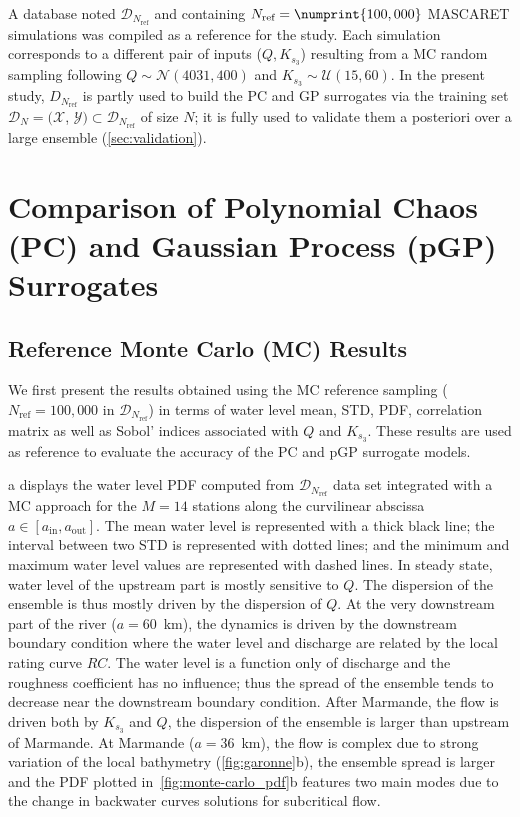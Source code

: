 A database noted $\mathcal{D}_{N_{\text{ref}}}$ and containing $N_{\text{ref}} = \numprint{100,000}$ MASCARET simulations was compiled as a reference for the study. Each simulation corresponds to a different pair of inputs ($Q, K_{s_3}$) resulting from a MC random sampling following $Q\sim\mathcal{N}(4031,400)$ and $K_{s_3} \sim \mathcal{U}(15,60)$. In the present study, $D_{N_{\text{ref}}}$ is partly used to build the PC and GP surrogates via the training set 
$\mathcal{D}_N = (\mathcal{X}$, $\mathcal{Y})\subset \mathcal{D}_{N_{\text{ref}}}$ of size $N$; it is fully used to validate them a posteriori over a large ensemble (\cref{sec:validation}).


\section{Comparison of Polynomial Chaos (PC) and Gaussian Process (pGP) Surrogates}\label{sec:UQresults}

\subsection{Reference Monte Carlo (MC) Results}
\label{sec:UQresults_ref}

We first present the results obtained using the MC reference sampling ($N_{\text{ref}} = 100,000$ in $\mathcal{D}_{N_{\text{ref}}}$) in terms of water level mean, STD, PDF, correlation matrix as well as Sobol' indices associated with $Q$ and $K_{s_3}$. These results are used as reference to evaluate the accuracy of the PC and pGP surrogate models.

a displays the water level PDF computed from $\mathcal{D}_{N_{\text{ref}}}$ data set integrated with a MC approach for the $M = 14$ stations along the curvilinear abscissa $a \in [a_{\text{in}}, a_{\text{out}}]$. The mean water level is represented with a thick black line; the interval between two STD is represented with dotted lines; and the minimum and maximum water level values are represented with dashed lines. In steady state, water level of the upstream part is mostly sensitive to $Q$. The dispersion of the ensemble is thus mostly driven by the dispersion of $Q$. At the very downstream part of the river ($a=60$~km), the dynamics is driven by the downstream boundary condition where the water level and discharge are related by the local rating curve $RC$. The water level is a function only of discharge and the roughness coefficient has no influence; thus the spread of the ensemble tends to decrease near the downstream boundary condition. After Marmande, the flow is driven both by $K_{s_3}$ and $Q$, the dispersion of the ensemble is larger than upstream of Marmande. At Marmande ($a = 36$~km), the flow is complex due to strong variation of the local bathymetry (\cref{fig:garonne}b), the ensemble spread is larger and the PDF plotted in~\cref{fig:monte-carlo_pdf}b features two main modes due to the change in backwater curves solutions for subcritical flow.
 
